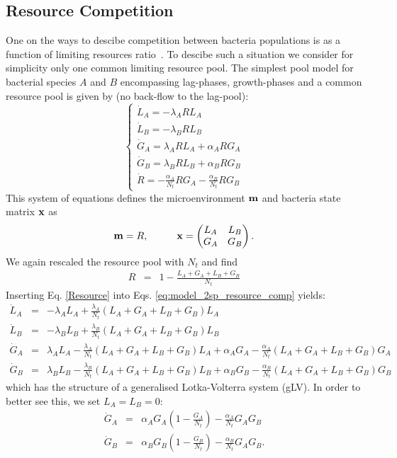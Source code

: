 \documentclass[10pt,A4paper]{article}
\begin{document}
\subsection{Resource Competition}
One on the ways to descibe competition between bacteria populations is as a function of limiting resources ratio~\cite{tilman_resource_1977, smith_effects_2002}.
To descibe such a situation we consider for simplicity only one common limiting resource pool. 
The simplest pool model for bacterial species $A$ and $B$ encompassing lag-phases, growth-phases and a common resource pool is given by (no back-flow to the lag-pool):
\begin{equation}
    \begin{cases}
        \dot{L}_A = - \lambda_A R L_A\\
        \dot{L}_B = - \lambda_B R L_B \\
        \dot{G}_A = \lambda_A R L_A +\alpha_A R G_A\\
        \dot{G}_B = \lambda_B R L_B +\alpha_B R G_B\\
        \dot{R} =-\frac{\alpha_A}{N_t} R G_A-\frac{\alpha_B}{N_t} R G_B
    \end{cases}
    \label{eq:model_2sp_resource_comp}
\end{equation}
This system of equations defines the microenvironment $\mathbf{m}$ and bacteria state matrix $\mathbf{x}$ as
\begin{equation}
    \mathbf{m} = R, \hspace{1cm}
    \mathbf{x} = \begin{pmatrix}
        L_A & L_B \\
        G_A & G_B 
    \end{pmatrix}.
\end{equation}
We again rescaled the resource pool with $N_t$ and find
\begin{eqnarray}
\label{Resource}
R &=&1-\frac{L_A+G_A+L_B+G_B}{N_t}
\end{eqnarray}
Inserting Eq. \ref{Resource} into Eqs. \ref{eq:model_2sp_resource_comp} yields:
\begin{eqnarray*}
    \dot{L}_A &=& - \lambda_A  L_A + \frac{\lambda_A}{N_t}\left(L_A+G_A+L_B+G_B\right)L_A\\
    \dot{L}_B &=& - \lambda_B L_B + \frac{\lambda_B}{N_t}\left(L_A+G_A+L_B+G_B\right)L_B \\
    \dot{G}_A &=&  \lambda_A  L_A - \frac{\lambda_A}{N_t}\left(L_A+G_A+L_B+G_B\right)L_A +\alpha_A G_A - \frac{\alpha_A}{N_t}\left(L_A+G_A+L_B+G_B\right)G_A\\
    \dot{G}_B &=& \lambda_B L_B - \frac{\lambda_B}{N_t}\left(L_A+G_A+L_B+G_B\right)L_B  +\alpha_B G_B -\frac{\alpha_B}{N_t}\left(L_A+G_A+L_B+G_B\right)G_B
\end{eqnarray*}
which has the structure of a generalised Lotka-Volterra system (gLV).
In order to better see this, we set $L_A=L_B=0$: 
\begin{eqnarray}
    \dot{G}_A &=& \alpha_A G_A\left(1 - \frac{G_A}{N_t}\right) - \frac{\alpha_A}{N_t}G_AG_B
    \label{eq:LV_simple1}\\
    \dot{G}_B &=& \alpha_B G_B\left(1-\frac{G_B}{N_t}\right) -\frac{\alpha_B}{N_t}G_AG_B. 
    \label{eq:LV_simple2}
\end{eqnarray} 
\end{document}
